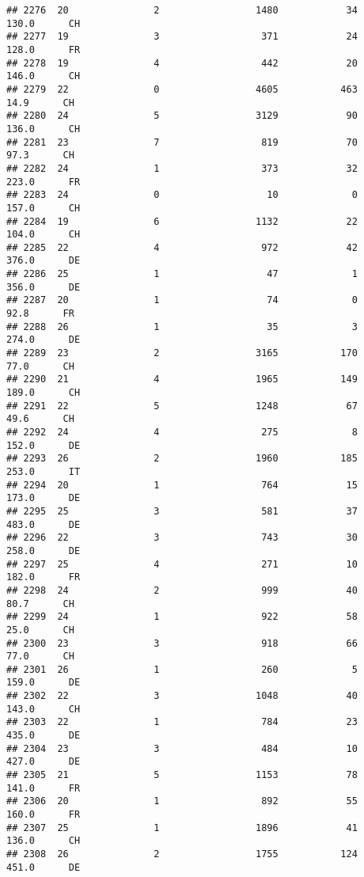 \documentclass[
]{article}
\begin{document}
\begin{verbatim}
## 2276  20               2                 1480            34    130.0      CH
## 2277  19               3                  371            24    128.0      FR
## 2278  19               4                  442            20    146.0      CH
## 2279  22               0                 4605           463     14.9      CH
## 2280  24               5                 3129            90    136.0      CH
## 2281  23               7                  819            70     97.3      CH
## 2282  24               1                  373            32    223.0      FR
## 2283  24               0                   10             0    157.0      CH
## 2284  19               6                 1132            22    104.0      CH
## 2285  22               4                  972            42    376.0      DE
## 2286  25               1                   47             1    356.0      DE
## 2287  20               1                   74             0     92.8      FR
## 2288  26               1                   35             3    274.0      DE
## 2289  23               2                 3165           170     77.0      CH
## 2290  21               4                 1965           149    189.0      CH
## 2291  22               5                 1248            67     49.6      CH
## 2292  24               4                  275             8    152.0      DE
## 2293  26               2                 1960           185    253.0      IT
## 2294  20               1                  764            15    173.0      DE
## 2295  25               3                  581            37    483.0      DE
## 2296  22               3                  743            30    258.0      DE
## 2297  25               4                  271            10    182.0      FR
## 2298  24               2                  999            40     80.7      CH
## 2299  24               1                  922            58     25.0      CH
## 2300  23               3                  918            66     77.0      CH
## 2301  26               1                  260             5    159.0      DE
## 2302  22               3                 1048            40    143.0      CH
## 2303  22               1                  784            23    435.0      DE
## 2304  23               3                  484            10    427.0      DE
## 2305  21               5                 1153            78    141.0      FR
## 2306  20               1                  892            55    160.0      FR
## 2307  25               1                 1896            41    136.0      CH
## 2308  26               2                 1755           124    451.0      DE

\end{verbatim}
\end{document}
